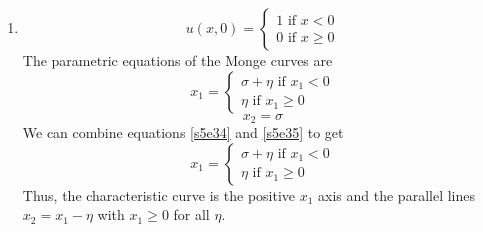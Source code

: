 \documentclass{article}
\theoremstyle{plain}
\numberwithin{thm}{section}
\theoremstyle{plain}
\numberwithin{prop}{section}
\theoremstyle{definition}
\numberwithin{defn}{section}
\theoremstyle{remark}
\numberwithin{equation}{section}
\begin{document}
\begin{enumerate}
\begin{enumerate}
\item \begin{equation}\label{s5e37}
u(x, 0) = \begin{cases}
1 \text{ if } x < 0 \\
0 \text{ if } x \ge 0
\end{cases}
\end{equation}
The parametric equations of the Monge curves are
\begin{equation}\label{s5e38}
x_1 = \begin{cases}
\sigma + \eta \text{ if } x_1 < 0 \\
\eta \text{ if } x_1 \ge 0
\end{cases}
\end{equation}
\begin{equation}\label{s5e39}
x_2 = \sigma
\end{equation}
We can combine equations \eqref{s5e34} and \eqref{s5e35} to get
\begin{equation}\label{s5e40}
x_1 = \begin{cases}
\sigma + \eta \text{ if } x_1 < 0 \\
\eta \text{ if } x_1 \ge 0
\end{cases}
\end{equation}
Thus, the characteristic curve is the positive $x_1$ axis and the parallel lines $x_2 = x_1 - \eta$
with $x_1 \ge 0$ for all $\eta$.


\end{enumerate}
\end{enumerate}
\end{document}

